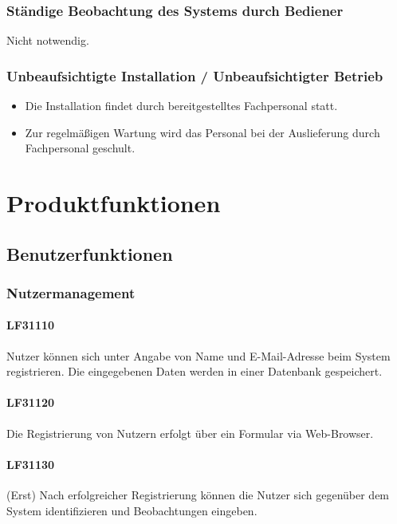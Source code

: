 \documentclass[a4paper,11pt]{scrartcl}
\begin{document}
		\subsubsection{Ständige Beobachtung des Systems durch Bediener}
			Nicht notwendig.
		\subsubsection{Unbeaufsichtigte Installation / Unbeaufsichtigter Betrieb}
			\begin{itemize}
				\item Die Installation findet durch bereitgestelltes Fachpersonal statt.
				\item Zur regelmäßigen Wartung wird das Personal bei der Auslieferung durch Fachpersonal geschult.
			\end{itemize}



\section{Produktfunktionen}
	\subsection{Benutzerfunktionen}
		\subsubsection{Nutzermanagement}
			\paragraph{LF31110}
				Nutzer können sich unter Angabe von Name und E-Mail-Adresse beim System registrieren.
				Die eingegebenen Daten werden in einer Datenbank gespeichert.
			\paragraph{LF31120}
				Die Registrierung von Nutzern erfolgt über ein Formular via Web-Browser.
			\paragraph{LF31130}
				(Erst) Nach erfolgreicher Registrierung können die Nutzer sich gegenüber dem System identifizieren und Beobachtungen eingeben.
\end{document}
